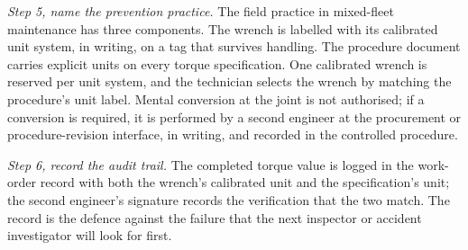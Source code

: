\begin{exercise}
\textit{Step 5, name the prevention practice.} The field practice in
mixed-fleet maintenance has three components. The wrench is labelled
with its calibrated unit system, in writing, on a tag that survives
handling. The procedure document carries explicit units on every
torque specification. One calibrated wrench is reserved per unit
system, and the technician selects the wrench by matching the
procedure's unit label. Mental conversion at the joint is not
authorised; if a conversion is required, it is performed by a second
engineer at the procurement or procedure-revision interface, in
writing, and recorded in the controlled procedure.

\textit{Step 6, record the audit trail.} The completed torque value
is logged in the work-order record with both the wrench's calibrated
unit and the specification's unit; the second engineer's signature
records the verification that the two match. The record is the
defence against the failure that the next inspector or accident
investigator will look for first.
\end{exercise}

